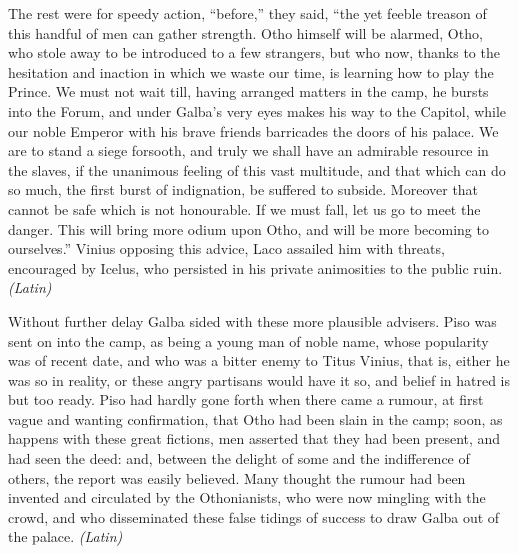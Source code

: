 
The rest were for speedy action, ``before,'' they said, ``the yet feeble treason of this handful of men can gather strength. Otho himself will be alarmed, Otho, who stole away to be introduced to a few strangers, but who now, thanks to the hesitation and inaction in which we waste our time, is learning how to play the Prince. We must not wait till, having arranged matters in the camp, he bursts into the Forum, and under Galba's very eyes makes his way to the Capitol, while our noble Emperor with his brave friends barricades the doors of his palace. We are to stand a siege forsooth, and truly we shall have an admirable resource in the slaves, if the unanimous feeling of this vast multitude, and that which can do so much, the first burst of indignation, be suffered to subside. Moreover that cannot be safe which is not honourable. If we must fall, let us go to meet the danger. This will bring more odium upon Otho, and will be more becoming to ourselves.'' Vinius opposing this advice, Laco assailed him with threats, encouraged by Icelus, who persisted in his private animosities to the public ruin. \emph{(Latin)}


Without further delay Galba sided with these more plausible advisers. Piso was sent on into the camp, as being a young man of noble name, whose popularity was of recent date, and who was a bitter enemy to Titus Vinius, that is, either he was so in reality, or these angry partisans would have it so, and belief in hatred is but too ready. Piso had hardly gone forth when there came a rumour, at first vague and wanting confirmation, that Otho had been slain in the camp; soon, as happens with these great fictions, men asserted that they had been present, and had seen the deed: and, between the delight of some and the indifference of others, the report was easily believed. Many thought the rumour had been invented and circulated by the Othonianists, who were now mingling with the crowd, and who disseminated these false tidings of success to draw Galba out of the palace. \emph{(Latin)}


